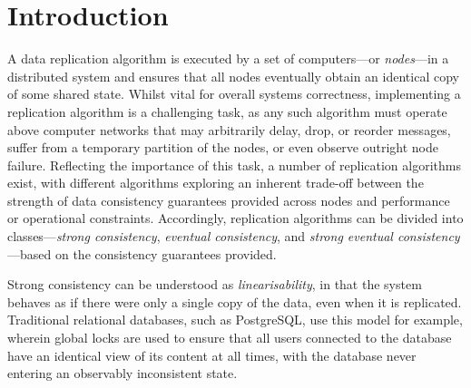 \documentclass[acmlarge,review,anonymous]{acmart}\settopmatter{printfolios=true}
\begin{document}


\maketitle



\section{Introduction}
\label{sect.introduction}

A data replication algorithm is executed by a set of computers---or \emph{nodes}---in a distributed system and ensures that all nodes eventually obtain an identical copy of some shared state.
Whilst vital for overall systems correctness, implementing a replication algorithm is a challenging task, as any such algorithm must operate above computer networks that may arbitrarily delay, drop, or reorder messages, suffer from a temporary partition of the nodes, or even observe outright node failure.
Reflecting the importance of this task, a number of replication algorithms exist, with different algorithms exploring an inherent trade-off between the strength of data consistency guarantees provided across nodes and performance or operational constraints.
Accordingly, replication algorithms can be divided into classes---\emph{strong consistency}, \emph{eventual consistency}, and \emph{strong eventual consistency}---based on the consistency guarantees provided.

Strong consistency can be understood as \emph{linearisability}, in that the system behaves as if there were only a single copy of the data, even when it is replicated.
Traditional relational databases, such as PostgreSQL, use this model for example, wherein global locks are used to ensure that all users connected to the database have an identical view of its content at all times, with the database never entering an observably inconsistent state.
\end{document}
